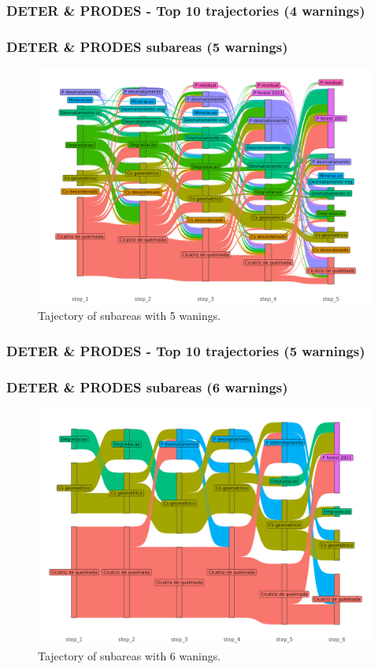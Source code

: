 \documentclass[aspectratio=169]{beamer}
\begin{document}
\begin{frame}[allowframebreaks]
    \frametitle{DETER \& PRODES - Top 10 trajectories (4 warnings)}
    
\end{frame}

\begin{frame}
    \frametitle{DETER \& PRODES subareas (5 warnings)}
    \begin{figure}[h] 
        \includegraphics[width=0.65\linewidth]
        {./figures/plot_deter_prodes_subarea_trajectory_5.png}
        \caption{Tajectory of subareas with 5 wanings.}
        \label{fig:deter_prodes_subarea_trajectory_5}
    \end{figure}
\end{frame}

\begin{frame}[allowframebreaks]
    \frametitle{DETER \& PRODES - Top 10 trajectories (5 warnings)}
    
\end{frame}

\begin{frame}
    \frametitle{DETER \& PRODES subareas (6 warnings)}
    \begin{figure}[h] 
        \includegraphics[width=0.65\linewidth]
        {./figures/plot_deter_prodes_subarea_trajectory_6.png}
        \caption{Tajectory of subareas with 6 wanings.}
        \label{fig:deter_prodes_subarea_trajectory_6}
    \end{figure}
\end{frame}
\end{document}
